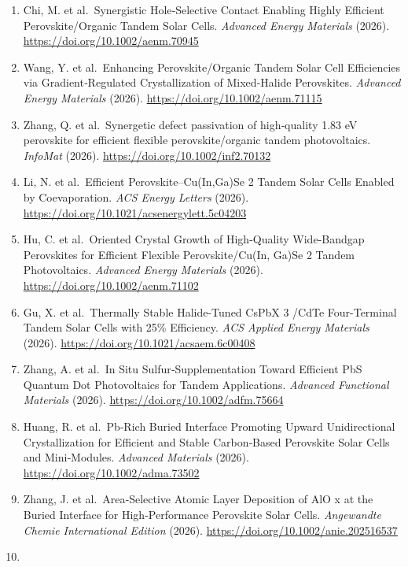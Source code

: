 \documentclass[
  11pt,
]{article}
\begin{document}
\begin{enumerate}
  organic bulk-heterojunction for efficient perovskite-organic tandem
  solar cells. \emph{Nature Communications} (2026).
  \url{https://doi.org/10.1038/s41467-026-73743-4}
\item
  Chi, M. et al.~Synergistic Hole‐Selective Contact Enabling Highly
  Efficient Perovskite/Organic Tandem Solar Cells. \emph{Advanced Energy
  Materials} (2026). \url{https://doi.org/10.1002/aenm.70945}
\item
  Wang, Y. et al.~Enhancing Perovskite/Organic Tandem Solar Cell
  Efficiencies via Gradient‐Regulated Crystallization of Mixed‐Halide
  Perovskites. \emph{Advanced Energy Materials} (2026).
  \url{https://doi.org/10.1002/aenm.71115}
\item
  Zhang, Q. et al.~Synergetic defect passivation of high‐quality 1.83 eV
  perovskite for efficient flexible perovskite/organic tandem
  photovoltaics. \emph{InfoMat} (2026).
  \url{https://doi.org/10.1002/inf2.70132}
\item
  Li, N. et al.~Efficient Perovskite--Cu(In,Ga)Se 2 Tandem Solar Cells
  Enabled by Coevaporation. \emph{ACS Energy Letters} (2026).
  \url{https://doi.org/10.1021/acsenergylett.5c04203}
\item
  Hu, C. et al.~Oriented Crystal Growth of High‐Quality Wide‐Bandgap
  Perovskites for Efficient Flexible Perovskite/Cu(In, Ga)Se 2 Tandem
  Photovoltaics. \emph{Advanced Energy Materials} (2026).
  \url{https://doi.org/10.1002/aenm.71102}
\item
  Gu, X. et al.~Thermally Stable Halide-Tuned CsPbX 3 /CdTe
  Four-Terminal Tandem Solar Cells with 25\% Efficiency. \emph{ACS
  Applied Energy Materials} (2026).
  \url{https://doi.org/10.1021/acsaem.6c00408}
\item
  Zhang, A. et al.~In Situ Sulfur‐Supplementation Toward Efficient PbS
  Quantum Dot Photovoltaics for Tandem Applications. \emph{Advanced
  Functional Materials} (2026). \url{https://doi.org/10.1002/adfm.75664}
\item
  Huang, R. et al.~Pb‐Rich Buried Interface Promoting Upward
  Unidirectional Crystallization for Efficient and Stable Carbon‐Based
  Perovskite Solar Cells and Mini‐Modules. \emph{Advanced Materials}
  (2026). \url{https://doi.org/10.1002/adma.73502}
\item
  Zhang, J. et al.~Area‐Selective Atomic Layer Deposition of AlO x at
  the Buried Interface for High‐Performance Perovskite Solar Cells.
  \emph{Angewandte Chemie International Edition} (2026).
  \url{https://doi.org/10.1002/anie.202516537}
\item

\end{enumerate}
\end{document}
